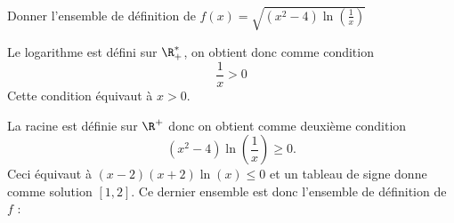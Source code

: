 


\begin{exercice}
Donner l'ensemble de définition de $f(x) = \sqrt{ (x^2-4)\ln\left(\frac{1}{x}\right)}$
\end{exercice}


\begin{correction}


Le logarithme est défini sur $\R^*_+$, on obtient donc comme condition 
$$\frac{1}{x}>0$$
Cette  condition équivaut à $x>0$.

La racine est définie sur $\R^+$ donc on obtient comme deuxième condition 
$$(x^2-4)\ln(\frac{1}{x}) \geq 0.$$
Ceci équivaut à $(x-2)(x+2) \ln(x)\leq 0$ et un tableau de signe donne comme solution $[1,2]$.
Ce dernier ensemble est donc l'ensemble de définition de $f$ :

\begin{center}
\end{center}
\end{correction}